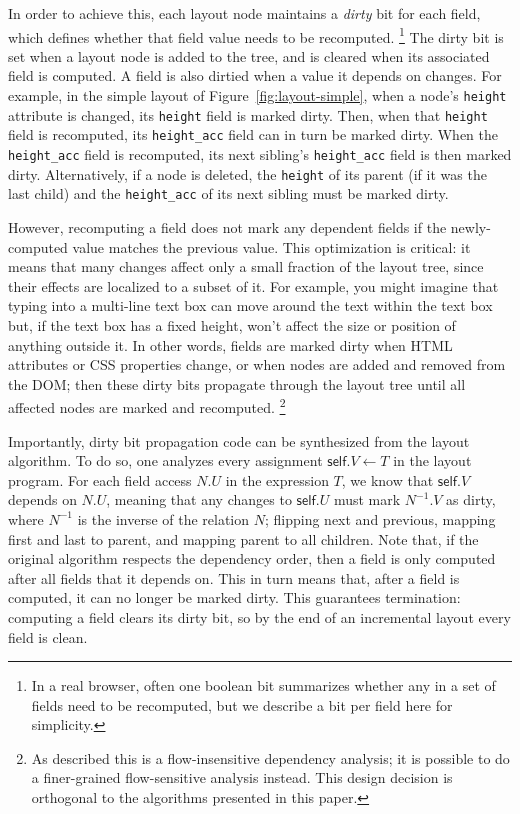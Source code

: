 In order to achieve this,
  each layout node maintains a \textit{dirty} bit for each field,
  which defines whether that field value needs to be recomputed.%
\footnote{In a real browser, often one boolean bit
  summarizes whether any in a set of fields need to be recomputed,
  but we describe a bit per field here for simplicity.}
The dirty bit is set when a layout node is added to the tree,
  and is cleared when its associated field is computed.
A field is also dirtied when a value it depends on changes.
For example, in the simple layout of Figure~\ref{fig:layout-simple},
  when a node's \texttt{height} attribute is changed,
  its \texttt{height} field is marked dirty.
Then, when that \texttt{height} field is recomputed,
  its \texttt{height\_acc} field can in turn be marked dirty.
When the \texttt{height\_acc} field is recomputed,
  its next sibling's \texttt{height\_acc} field is then marked dirty.
Alternatively, if a node is deleted,
  the \texttt{height} of its parent
  (if it was the last child)
  and the \texttt{height\_acc} of its next sibling
  must be marked dirty.

However, recomputing a field does not mark any dependent fields
  if the newly-computed value matches the previous value.
This optimization is critical:
  it means that many changes affect only a
  small fraction of the layout tree,
  since their effects are localized to a subset of it.
For example, you might imagine that typing into a multi-line text box
  can move around the text within the text box
  but, if the text box has a fixed height,
  won't affect the size or position of anything outside it.
In other words, fields are marked dirty when
  HTML attributes or CSS properties change,
  or when nodes are added and removed from the DOM;
  then these dirty bits propagate through the layout tree
  until all affected nodes are marked and recomputed.%
\footnote{
  As described this is a flow-insensitive dependency analysis;
    it is possible to do a finer-grained flow-sensitive analysis instead.
  This design decision is orthogonal to the algorithms presented in this paper.
}

Importantly, dirty bit propagation code
  can be synthesized from the layout algorithm.
To do so, one analyzes every assignment $\mathsf{self}.V \gets T$
  in the layout program.
For each field access $N.U$ in the expression $T$,
  we know that $\mathsf{self}.V$ depends on $N.U$,
  meaning that any changes to $\mathsf{self}.U$
  must mark $N^{-1}.V$ as dirty,
  where $N^{-1}$ is the inverse of the relation $N$;
  flipping \textsf{next} and \textsf{previous},
  mapping \textsf{first} and \textsf{last} to \textsf{parent},
  and mapping \textsf{parent} to all children.
Note that, if the original algorithm respects the dependency order,
  then a field is only computed after all fields that it depends on.
This in turn means that, after a field is computed,
  it can no longer be marked dirty.
This guarantees termination:
  computing a field clears its dirty bit, so by the end of an incremental layout
  every field is clean.

